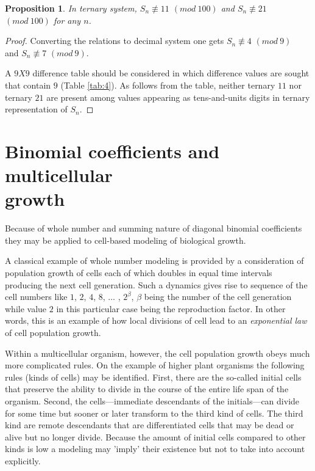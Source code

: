 \documentclass[12pt, twoside, leqno]{article}
\newtheorem{prop}[thm]{Proposition}
\theoremstyle{definition}
\numberwithin{equation}{section}
\begin{document}
\begin{prop}
In ternary system, $S_n \not\equiv 11$ $(mod \ 100)$ and $S_n \not\equiv 21$ $(mod \ 100)$ for any $n$.
\end{prop}

\begin{proof}
Converting the relations to decimal system one gets $S_n \not\equiv 4$ $(mod \ 9)$ \\ and $S_n \not\equiv 7$ $(mod \ 9)$.

A $9X9$ difference table should be considered in which difference values are sought that contain $9$ (Table \ref{tab:4}). As follows from the table, neither ternary $11$ nor ternary $21$ are present among values appearing as tens-and-units digits in ternary representation of $S_n$.
\end{proof}

\section{Binomial coefficients and multicellular \\ growth}

Because of whole number and summing nature of diagonal binomial coefficients they may be applied to cell-based modeling of biological growth.

A classical example of whole number modeling is provided by a consideration of population growth of cells each of which doubles in equal time intervals producing the next cell generation. Such a dynamics gives rise to sequence of the cell numbers like $1$, $2$, $4$, $8$, $\dots$ , $2^\beta $, $\beta $ being the number of the cell generation while value $2$ in this particular case being the reproduction factor. In other words, this is an example of how local divisions of cell lead to an \textit{exponential law} of cell population growth.

Within a multicellular organism, however, the cell population growth obeys much more complicated rules. On the example of higher plant organisms the following rules (kinds of cells) may be identified. First, there are the so-called initial cells that preserve the ability to divide in the course of the entire life span of the organism. Second, the cells---immediate descendants of the initials---can divide for some time but sooner or later transform to the third kind of cells. The third kind are remote descendants that are differentiated cells that may be dead or alive but no longer divide. Because the amount of initial cells compared to  other kinds is low a modeling may 'imply' their existence but not to take into account explicitly.
\end{document}
